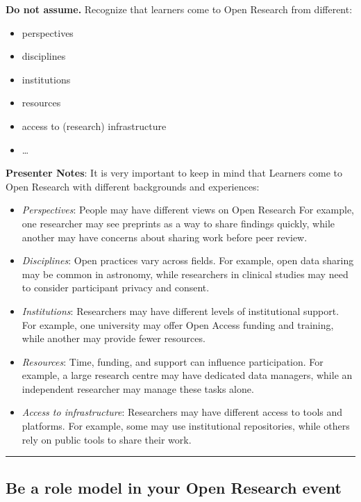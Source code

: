 \documentclass[
  letterpaper,
  DIV=11,
  numbers=noendperiod]{scrartcl}
\providecommand{\tightlist}{%
  \setlength{\itemsep}{0pt}\setlength{\parskip}{0pt}}
\begin{document}
\textbf{Do not assume.} Recognize that learners come to Open Research
from different:

\begin{itemize}
\tightlist
\item
  perspectives
\item
  disciplines
\item
  institutions
\item
  resources
\item
  access to (research) infrastructure
\item
  \ldots{}
\end{itemize}

\textbf{Presenter Notes}: It is very important to keep in mind that
Learners come to Open Research with different backgrounds and
experiences:

\begin{itemize}
\tightlist
\item
  \emph{Perspectives}: People may have different views on Open Research
  For example, one researcher may see preprints as a way to share
  findings quickly, while another may have concerns about sharing work
  before peer review.
\item
  \emph{Disciplines}: Open practices vary across fields. For example,
  open data sharing may be common in astronomy, while researchers in
  clinical studies may need to consider participant privacy and consent.
\item
  \emph{Institutions}: Researchers may have different levels of
  institutional support. For example, one university may offer Open
  Access funding and training, while another may provide fewer
  resources.
\item
  \emph{Resources}: Time, funding, and support can influence
  participation. For example, a large research centre may have dedicated
  data managers, while an independent researcher may manage these tasks
  alone.
\item
  \emph{Access to infrastructure}: Researchers may have different access
  to tools and platforms. For example, some may use institutional
  repositories, while others rely on public tools to share their work.
\end{itemize}

\begin{center}\rule{0.5\linewidth}{0.5pt}\end{center}

\subsection{Be a role model in your Open Research
event}\label{be-a-role-model-in-your-open-research-event}
\end{document}
